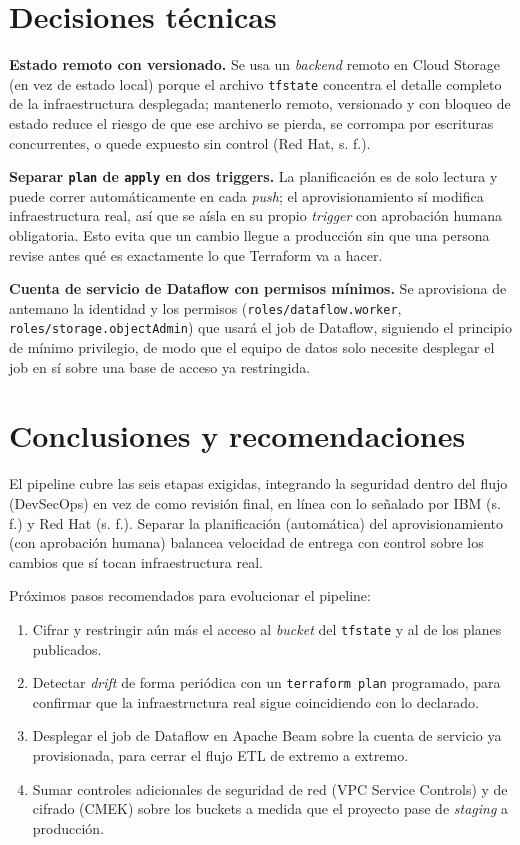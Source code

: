 \documentclass[11pt,a4paper]{article}
\begin{document}
\section{Decisiones técnicas}

\textbf{Estado remoto con versionado.} Se usa un \emph{backend} remoto en Cloud Storage (en vez de estado local) porque el archivo \texttt{tfstate} concentra el detalle completo de la infraestructura desplegada; mantenerlo remoto, versionado y con bloqueo de estado reduce el riesgo de que ese archivo se pierda, se corrompa por escrituras concurrentes, o quede expuesto sin control (Red Hat, s. f.).

\textbf{Separar \texttt{plan} de \texttt{apply} en dos triggers.} La planificación es de solo lectura y puede correr automáticamente en cada \emph{push}; el aprovisionamiento sí modifica infraestructura real, así que se aísla en su propio \emph{trigger} con aprobación humana obligatoria. Esto evita que un cambio llegue a producción sin que una persona revise antes qué es exactamente lo que Terraform va a hacer.

\textbf{Cuenta de servicio de Dataflow con permisos mínimos.} Se aprovisiona de antemano la identidad y los permisos (\texttt{roles/dataflow.worker}, \texttt{roles/storage.objectAdmin}) que usará el job de Dataflow, siguiendo el principio de mínimo privilegio, de modo que el equipo de datos solo necesite desplegar el job en sí sobre una base de acceso ya restringida.

\section{Conclusiones y recomendaciones}

El pipeline cubre las seis etapas exigidas, integrando la seguridad dentro del flujo (DevSecOps) en vez de como revisión final, en línea con lo señalado por IBM (s. f.) y Red Hat (s. f.). Separar la planificación (automática) del aprovisionamiento (con aprobación humana) balancea velocidad de entrega con control sobre los cambios que sí tocan infraestructura real.

Próximos pasos recomendados para evolucionar el pipeline:

\begin{enumerate}
  \item Cifrar y restringir aún más el acceso al \emph{bucket} del \texttt{tfstate} y al de los planes publicados.
  \item Detectar \emph{drift} de forma periódica con un \texttt{terraform plan} programado, para confirmar que la infraestructura real sigue coincidiendo con lo declarado.
  \item Desplegar el job de Dataflow en Apache Beam sobre la cuenta de servicio ya provisionada, para cerrar el flujo ETL de extremo a extremo.
  \item Sumar controles adicionales de seguridad de red (VPC Service Controls) y de cifrado (CMEK) sobre los buckets a medida que el proyecto pase de \emph{staging} a producción.
\end{enumerate}
\end{document}
